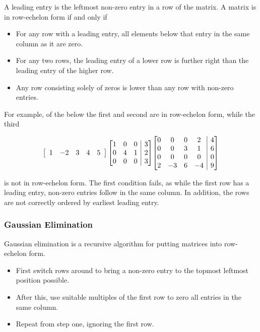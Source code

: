 \documentclass[12pt]{report}
\makeatletter
\newenvironment{amatrix}[1]{%
  \left[\begin{array}{@{}*{#1}{c}|c@{}}
}{%
  \end{array}\right]
}
\makeatother
\begin{document}
\begin{flushleft}
A leading entry is the leftmost non-zero entry in a row of the matrix. A matrix
is in row-echelon form if and only if
\begin{itemize}
  \item For any row with a leading entry, all elements below that entry in the
    same column as it are zero.
  \item For any two rows, the leading entry of a lower row is further right than
    the leading entry of the higher row.
  \item Any row consisting solely of zeros is lower than any row with non-zero
    entries.
\end{itemize}
For example, of the below the first and second are in row-echelon form, while
the third

\[
  \left[\begin{array}{ccccc}
    1 & -2 & 3 & 4 & 5
  \end{array}\right]
  \begin{amatrix}{3}
      1 & 0 & 0 & 3 \\
      0 & 4 & 1 & 2 \\
      0 & 0 & 0 & 3 \\
  \end{amatrix}
  \begin{amatrix}{4}
      0 & 0 & 0 & 2 & 4 \\
      0 & 0 & 3 & 1 & 6 \\
      0 & 0 & 0 & 0 & 0 \\
      2 & -3 & 6 & -4 & 9 \\
  \end{amatrix}
\]

is not in row-echelon form. The first condition fails, as while the first row
has a leading entry, non-zero entries follow in the same column. In addition,
the rows are not correctly ordered by earliest leading entry.

\subsubsection*{Gaussian Elimination}

Gaussian elimination is a recursive algorithm for putting matrices into
row-echelon form. 

\begin{itemize}
    \item First switch rows around to bring a non-zero entry to the topmost
        leftmost position possible.
    \item After this, use suitable multiples of the first row to zero all
        entries in the same column.
    \item Repeat from step one, ignoring the first row.
\end{itemize}


\end{flushleft}
\end{document}
